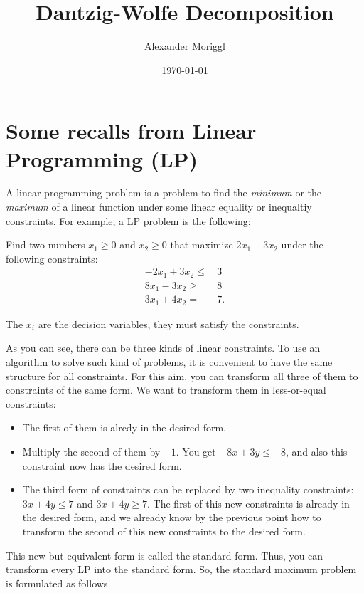 \documentclass[a4paper,12pt]{article}
\begin{document}
\title{Dantzig-Wolfe Decomposition}
\author{Alexander Moriggl}
\date{\today}

\maketitle


\newpage
\section{Some recalls from Linear Programming (LP)}

A linear programming problem is a problem to find the \textit{minimum} or the \textit{maximum} of a linear function under some linear equality or inequaltiy constraints. For example, a LP problem is the following:

Find two numbers $x_1 \geq 0$ and $x_2 \geq 0$ that maximize $2x_1 + 3x_2$ under the following constraints: 
\begin{align*}
-2x_1 +3x_2 \leq& \, 3 \\
8x_1 - 3x_2 \geq& \,8 \\
3x_1 + 4x_2 =& \,7 .
\end{align*}

The $x_i$ are the decision variables, they must satisfy the constraints. 

As you can see, there can be three kinds of linear constraints. To use an algorithm to solve such kind of problems, it is convenient to have the same structure for all constraints. For this aim, you can transform all three of them to constraints of the same form. We want to transform them in less-or-equal constraints:
\begin{itemize}
\item The first of them is alredy in the desired form.
\item Multiply the second of them by $-1$. You get $-8x+3y\leq-8$, and also this constraint now has the desired form.
\item The third form of constraints can be replaced by two inequality constraints: $3x + 4y \leq 7$ and $3x + 4y \geq 7$. The first of this new constraints is already in the desired form, and we already know by the previous point how to transform the second of this new constraints to the desired form.
\end{itemize}
This new but equivalent form is called the standard form. Thus, you can transform every LP into the standard form. So, the standard maximum problem is formulated as follows
  
\end{document}
